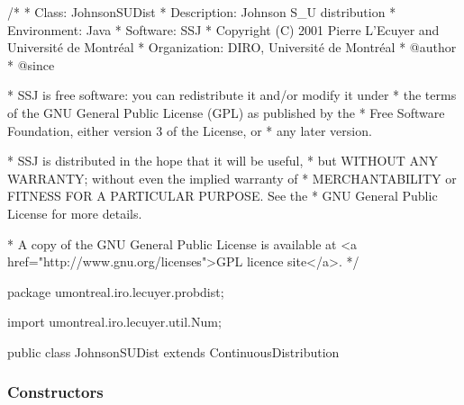 \begin{code}
\begin{hide}
/*
 * Class:        JohnsonSUDist
 * Description:  Johnson S_U distribution
 * Environment:  Java
 * Software:     SSJ 
 * Copyright (C) 2001  Pierre L'Ecuyer and Université de Montréal
 * Organization: DIRO, Université de Montréal
 * @author       
 * @since

 * SSJ is free software: you can redistribute it and/or modify it under
 * the terms of the GNU General Public License (GPL) as published by the
 * Free Software Foundation, either version 3 of the License, or
 * any later version.

 * SSJ is distributed in the hope that it will be useful,
 * but WITHOUT ANY WARRANTY; without even the implied warranty of
 * MERCHANTABILITY or FITNESS FOR A PARTICULAR PURPOSE.  See the
 * GNU General Public License for more details.

 * A copy of the GNU General Public License is available at
   <a href="http://www.gnu.org/licenses">GPL licence site</a>.
 */
\end{hide}
package umontreal.iro.lecuyer.probdist;\begin{hide}
import umontreal.iro.lecuyer.util.Num;
\end{hide}

public class JohnsonSUDist extends ContinuousDistribution\begin{hide} {
   private double gamma;
   private double delta;
   private double xi;
   private double lambda;

   private static double calcR (double a, double b, double x) {
      /*** Soit y = (x - a)/b; cette fonction calcule r
              r = y + sqrt(y*y + 1)
            en utilisant un algorithme stable ****/

      double y = (x - a)/b;
      boolean negative;
      if (y < 0.0) {
         y = -y;
         negative = true;
      } else
         negative = false;

      double r;
      if (y < 1.0e10)
         r = y + Math.sqrt (1.0 + y*y);
      else
         r = 2.0 * y;
      if (negative)
         r = 1.0 / r;
      return r;
   }
\end{hide}
\end{code}
\subsubsection* {Constructors}

